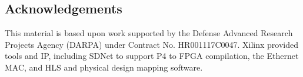 \documentclass[sigconf]{acmart}
\begin{document}



\maketitle








\subsection*{Acknowledgements}
This material is based upon work supported by the Defense Advanced
Research Projects Agency (DARPA) under Contract No. HR001117C0047.
Xilinx provided tools and IP, including SDNet to support P4 to FPGA
compilation, the Ethernet MAC, and HLS and physical design mapping
software. 



\end{document}
